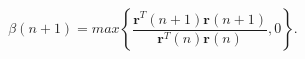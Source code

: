 \begin{equation}
\label{eq:fletcherreevesfw}
\beta(n + 1) = max \left\{\frac{\mathbf{r}^T(n + 1)
\mathbf{r}(n + 1)}{\mathbf{r}^T(n) \mathbf{r}(n)}, 0 \right\}.
\end{equation}

%